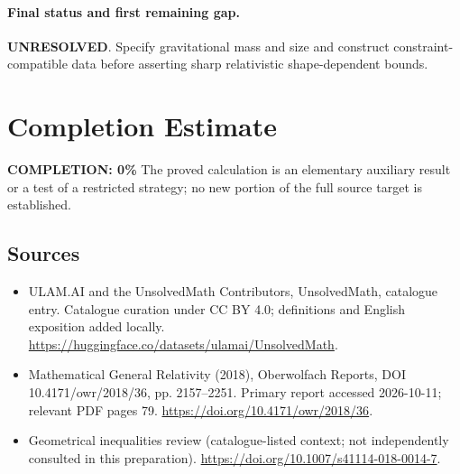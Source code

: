\documentclass[11pt]{article}
\begin{document}
\paragraph{Final status and first remaining gap.}
\textbf{UNRESOLVED}. Specify gravitational mass and size and construct constraint-compatible data before asserting sharp relativistic shape-dependent bounds.

\section{Completion Estimate}
\noindent\textbf{COMPLETION: 0\%}
The proved calculation is an elementary auxiliary result or a test of a restricted strategy; no new portion of the full source target is established.

\subsection{Sources}
\begin{itemize}
\item[\hypertarget{source:statement:1}{S1}] ULAM.AI and the UnsolvedMath Contributors, UnsolvedMath, catalogue entry. Catalogue curation under CC BY 4.0; definitions and English exposition added locally.
\url{https://huggingface.co/datasets/ulamai/UnsolvedMath}.
\item[\hypertarget{source:statement:2}{S2}] Mathematical General Relativity (2018), Oberwolfach Reports, DOI 10.4171/owr/2018/36, pp. 2157--2251. Primary report accessed 2026-10-11; relevant PDF pages 79.
\url{https://doi.org/10.4171/owr/2018/36}.
\item[\hypertarget{source:statement:3}{S3}] Geometrical inequalities review (catalogue-listed context; not independently consulted in this preparation).
\url{https://doi.org/10.1007/s41114-018-0014-7}.
\end{itemize}
\label{end:statement}
\end{document}
